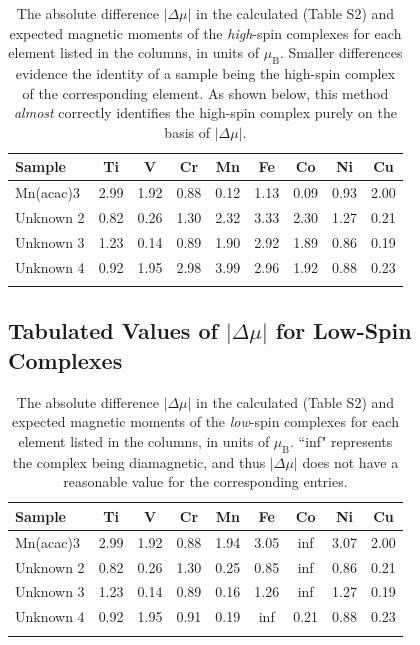 \documentclass[journal = jacsat, manuscript = suppinfo]{achemso}
\newcommand{\acac}[1]{\ce{#1(acac)3}}
\begin{document}
\begin{table}[H]
\begin{tabular}{lcccccccc}
\toprule
Sample &        Ti &         V &        Cr &        Mn &        Fe &        Co &        Ni &        Cu \\
\midrule
Mn(acac)3 &  2.99 &  1.92 &  0.88 &  0.12 &  1.13 &  0.09 &  0.93 &  2.00 \\
Unknown 2 &  0.82 &  0.26 &  1.30 &  2.32 &  3.33 &  2.30 &  1.27 &  0.21 \\
Unknown 3 &  1.23 &  0.14 &  0.89 &  1.90 &  2.92 &  1.89 &  0.86 &  0.19 \\
Unknown 4 &  0.92 &  1.95 &  2.98 &  3.99 &  2.96 &  1.92 &  0.88 &  0.23 \\
\bottomrule

\caption{The absolute difference $|\Delta\mu|$ in the calculated (Table S2) and
	expected magnetic moments of the \emph{high}-spin complexes for each
	element listed in the columns, in units of $\mu_\text{B}$. Smaller
	differences evidence the identity of a sample being the high-spin complex of the
	corresponding element. As shown below, this method \emph{almost} correctly
	identifies the high-spin complex \acac{Mn} purely on the basis of
	$|\Delta\mu|$.}

\end{tabular}
\end{table}

\subsection{Tabulated Values of $|\Delta\mu|$ for Low-Spin Complexes}

\begin{table}[H]
\begin{tabular}{lcccccccc}
\toprule
Sample &        Ti &         V &        Cr &        Mn &        Fe &        Co &        Ni &        Cu \\
\midrule
Mn(acac)3 &  2.99 &  1.92 &  0.88 &  1.94 &  3.05 &       inf &  3.07 &  2.00 \\
Unknown 2 &  0.82 &  0.26 &  1.30 &  0.25 &  0.85 &       inf &  0.86 &  0.21 \\
Unknown 3 &  1.23 &  0.14 &  0.89 &  0.16 &  1.26 &       inf &  1.27 &  0.19 \\
Unknown 4 &  0.92 &  1.95 &  0.91 &  0.19 &   inf &  0.21     &  0.88 &  0.23 \\
\bottomrule

\caption{The absolute difference $|\Delta\mu|$ in the calculated (Table S2) and
	expected magnetic moments of the \emph{low}-spin complexes for each
	element listed in the columns, in units of $\mu_\text{B}$. ``inf"
	represents the complex being diamagnetic, and thus $|\Delta\mu|$ does
	not have a reasonable value for the corresponding entries.}

\end{tabular}
\end{table}

% 
\end{document}
